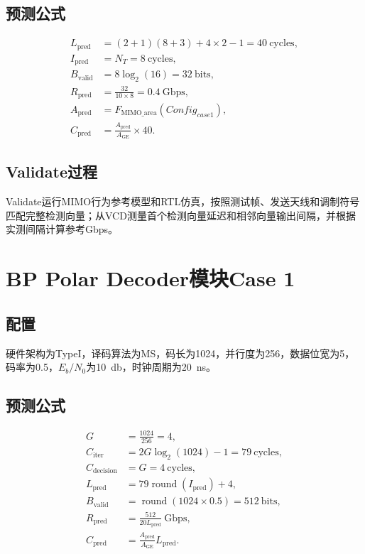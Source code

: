 \documentclass[a4paper,oneside,11pt]{ctexrep}
\begin{document}
\subsection{预测公式}

\begin{align}
    L_{\mathrm{pred}} &= (2+1)(8+3)+4\times2-1=40\ \mathrm{cycles},\\
    I_{\mathrm{pred}} &= N_T=8\ \mathrm{cycles},\\
    B_{\mathrm{valid}} &= 8\log_2(16)=32\ \mathrm{bits},\\
    R_{\mathrm{pred}} &= \frac{32}{10\times8}=0.4\ \mathrm{Gbps},\\
    A_{\mathrm{pred}} &= F_{\mathrm{MIMO\_area}}(Config_{case1}),\\
    C_{\mathrm{pred}} &= \frac{A_{\mathrm{pred}}}{A_{\mathrm{GE}}}\times40.
\end{align}

\subsection{Validate过程}

Validate运行MIMO行为参考模型和RTL仿真，按照测试帧、发送天线和调制符号匹配完整检测向量；从VCD测量首个检测向量延迟和相邻向量输出间隔，并根据实测间隔计算参考Gbps。

\section{BP Polar Decoder模块Case 1}

\subsection{配置}

硬件架构为TypeI，译码算法为MS，码长为1024，并行度为256，数据位宽为5，码率为0.5，$E_b/N_0$为\SI{10}{\decibel}，时钟周期为\SI{20}{\nano\second}。

\subsection{预测公式}

\begin{align}
    G &= \frac{1024}{256}=4,\\
    C_{\mathrm{iter}} &= 2G\log_2(1024)-1=79\ \mathrm{cycles},\\
    C_{\mathrm{decision}} &= G=4\ \mathrm{cycles},\\
    L_{\mathrm{pred}} &= 79\operatorname{round}(I_{\mathrm{pred}})+4,\\
    B_{\mathrm{valid}} &= \operatorname{round}(1024\times0.5)=512\ \mathrm{bits},\\
    R_{\mathrm{pred}} &= \frac{512}{20L_{\mathrm{pred}}}\ \mathrm{Gbps},\\
    C_{\mathrm{pred}} &= \frac{A_{\mathrm{pred}}}{A_{\mathrm{GE}}}L_{\mathrm{pred}}.
\end{align}
\end{document}
